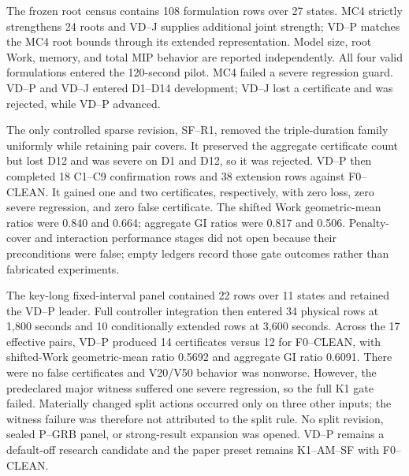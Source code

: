 The frozen root census contains 108 formulation rows over 27 states. MC4
strictly strengthens 24 roots and VD--J supplies additional joint strength;
VD--P matches the MC4 root bounds through its extended representation. Model
size, root Work, memory, and total MIP behavior are reported independently.
All four valid formulations entered the 120-second pilot. MC4 failed a severe
regression guard. VD--P and VD--J entered D1--D14 development; VD--J lost a
certificate and was rejected, while VD--P advanced.

The only controlled sparse revision, SF--R1, removed the triple-duration
family uniformly while retaining pair covers. It preserved the aggregate
certificate count but lost D12 and was severe on D1 and D12, so it was
rejected. VD--P then completed 18 C1--C9 confirmation rows and 38 extension
rows against F0--CLEAN. It gained one and two certificates, respectively,
with zero loss, zero severe regression, and zero false certificate. The
shifted Work geometric-mean ratios were 0.840 and 0.664; aggregate GI ratios
were 0.817 and 0.506. Penalty-cover and interaction performance stages did not
open because their preconditions were false; empty ledgers record those gate
outcomes rather than fabricated experiments.

The key-long fixed-interval panel contained 22 rows over 11 states and retained
the VD--P leader. Full controller integration then entered 34 physical rows at
1,800 seconds and 10 conditionally extended rows at 3,600 seconds. Across the
17 effective pairs, VD--P produced 14 certificates versus 12 for F0--CLEAN,
with shifted-Work geometric-mean ratio 0.5692 and aggregate GI ratio 0.6091.
There were no false certificates and V20/V50 behavior was nonworse. However,
the predeclared major witness suffered one severe regression, so the full K1
gate failed. Materially changed split actions occurred only on three other
inputs; the witness failure was therefore not attributed to the split rule.
No split revision, sealed P--GRB panel, or strong-result expansion was opened.
VD--P remains a default-off research candidate and the paper preset remains
K1--AM--SF with F0--CLEAN.

